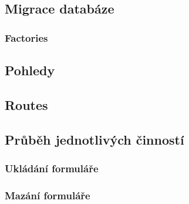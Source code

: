 	\subsection{Migrace databáze}
		\subsubsection{Factories}
	
	\subsection{Pohledy}
	
	\subsection{Routes}
	
	\subsection{Průběh jednotlivých činností}
		\subsubsection{Ukládání formuláře}
		\subsubsection{Mazání formuláře}


